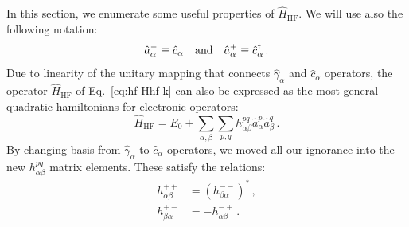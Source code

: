 In this section, we enumerate some useful properties of $\hat H_\mathrm{HF}$. We will use also the following notation:
\[
	\hat a_\alpha^- \equiv \hat c_\alpha
	\qq{and}
	\hat a_\alpha^+ \equiv \hat c_\alpha^\dagger \, .
\]
Due to linearity of the unitary mapping that connects $\hat \gamma_\alpha$ and $\hat c_\alpha$ operators, the operator $\hat H_\mathrm{HF}$ of Eq.~\eqref{eq:hf-Hhf-k} can also be expressed as the most general quadratic hamiltonians for electronic operators:
\begin{equation}\label{eq:hf-Hhf-h}
	\hat H_\mathrm{HF} = E_0 + \sum_{\alpha,\beta} \sum_{p,q} h_{\alpha\beta}^{pq} \hat a_\alpha^p \hat a_\beta^q \, .
\end{equation}
By changing basis from $\hat \gamma_\alpha$ to $\hat c_\alpha$ operators, we moved all our ignorance into the new $h_{\alpha\beta}^{pq}$ matrix elements. These satisfy the relations:
\begin{align}
	h_{\alpha\beta}^{++} &= \left(h_{\beta\alpha}^{--}\right)^* \label{eq:hf-offdiag-relation} \, ,\\
	h_{\beta\alpha}^{+-} &= - h_{\alpha\beta}^{-+} \label{eq:hf-ondiag-relation} \, .
\end{align}

